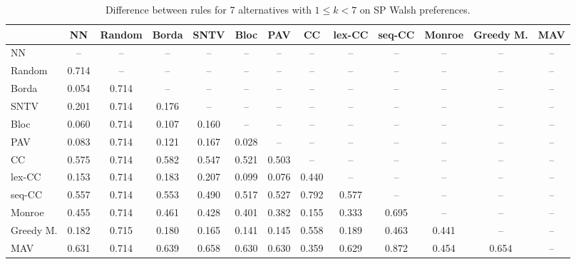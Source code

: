 
\begin{table*}[h!]
\centering
\begin{tabular}{lcccccccccccc}
\toprule
 & NN & Random & Borda & SNTV & Bloc & PAV & CC & lex-CC & seq-CC & Monroe & Greedy M. & MAV \\
\midrule
NN & -- & -- & -- & -- & -- & -- & -- & -- & -- & -- & -- & -- \\
Random & 0.714 & -- & -- & -- & -- & -- & -- & -- & -- & -- & -- & -- \\
Borda & 0.054 & 0.714 & -- & -- & -- & -- & -- & -- & -- & -- & -- & -- \\
SNTV & 0.201 & 0.714 & 0.176 & -- & -- & -- & -- & -- & -- & -- & -- & -- \\
Bloc & 0.060 & 0.714 & 0.107 & 0.160 & -- & -- & -- & -- & -- & -- & -- & -- \\
PAV & 0.083 & 0.714 & 0.121 & 0.167 & 0.028 & -- & -- & -- & -- & -- & -- & -- \\
CC & 0.575 & 0.714 & 0.582 & 0.547 & 0.521 & 0.503 & -- & -- & -- & -- & -- & -- \\
lex-CC & 0.153 & 0.714 & 0.183 & 0.207 & 0.099 & 0.076 & 0.440 & -- & -- & -- & -- & -- \\
seq-CC & 0.557 & 0.714 & 0.553 & 0.490 & 0.517 & 0.527 & 0.792 & 0.577 & -- & -- & -- & -- \\
Monroe & 0.455 & 0.714 & 0.461 & 0.428 & 0.401 & 0.382 & 0.155 & 0.333 & 0.695 & -- & -- & -- \\
Greedy M. & 0.182 & 0.715 & 0.180 & 0.165 & 0.141 & 0.145 & 0.558 & 0.189 & 0.463 & 0.441 & -- & -- \\
MAV & 0.631 & 0.714 & 0.639 & 0.658 & 0.630 & 0.630 & 0.359 & 0.629 & 0.872 & 0.454 & 0.654 & -- \\
\bottomrule
\end{tabular}

\caption{Difference between rules for 7 alternatives with $1 \leq k < 7$ on SP Walsh preferences.}
\end{table*}
